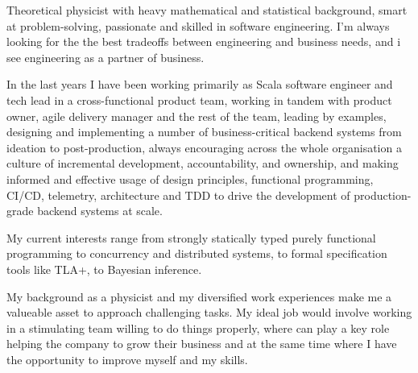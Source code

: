 
\begin{cvparagraph}
Theoretical physicist with heavy mathematical and statistical 
background, smart at problem-solving, passionate and skilled in software engineering. 
I'm always looking for the the best tradeoffs between engineering and business needs, and i see engineering as a partner of business. 

  In the last years I have been working primarily as Scala software engineer and tech lead in a cross-functional product team, working in tandem with product owner, agile delivery manager and the rest of the team, leading by examples, designing and implementing a number of business-critical backend systems from ideation to post-production, always encouraging across the whole organisation a culture of incremental development, accountability, and ownership, and making informed and effective usage of design principles, functional programming, CI/CD, telemetry, architecture and TDD to drive the development of production-grade backend systems at scale. 

	My current interests range from strongly statically typed purely functional programming to concurrency and distributed systems, to formal specification tools like TLA+, to Bayesian inference. 

My background as a physicist and my diversified work experiences make me a valueable asset to approach challenging tasks. 
My ideal job would involve working in a stimulating team willing to do things properly, where
can play a key role helping the company to grow their business and at the same time
where I have the opportunity to improve myself and my skills.
\end{cvparagraph}
